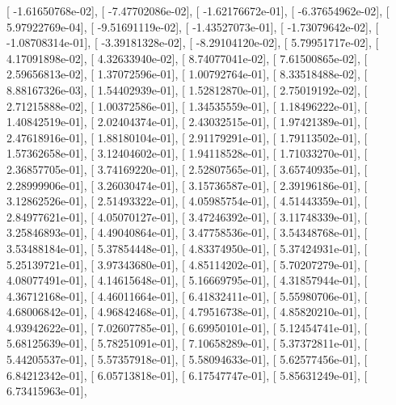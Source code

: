 \documentclass{article}
\begin{document}
       [ -1.61650768e-02],
       [ -7.47702086e-02],
       [ -1.62176672e-01],
       [ -6.37654962e-02],
       [  5.97922769e-04],
       [ -9.51691119e-02],
       [ -1.43527073e-01],
       [ -1.73079642e-02],
       [ -1.08708314e-01],
       [ -3.39181328e-02],
       [ -8.29104120e-02],
       [  5.79951717e-02],
       [  4.17091898e-02],
       [  4.32633940e-02],
       [  8.74077041e-02],
       [  7.61500865e-02],
       [  2.59656813e-02],
       [  1.37072596e-01],
       [  1.00792764e-01],
       [  8.33518488e-02],
       [  8.88167326e-03],
       [  1.54402939e-01],
       [  1.52812870e-01],
       [  2.75019192e-02],
       [  2.71215888e-02],
       [  1.00372586e-01],
       [  1.34535559e-01],
       [  1.18496222e-01],
       [  1.40842519e-01],
       [  2.02404374e-01],
       [  2.43032515e-01],
       [  1.97421389e-01],
       [  2.47618916e-01],
       [  1.88180104e-01],
       [  2.91179291e-01],
       [  1.79113502e-01],
       [  1.57362658e-01],
       [  3.12404602e-01],
       [  1.94118528e-01],
       [  1.71033270e-01],
       [  2.36857705e-01],
       [  3.74169220e-01],
       [  2.52807565e-01],
       [  3.65740935e-01],
       [  2.28999906e-01],
       [  3.26030474e-01],
       [  3.15736587e-01],
       [  2.39196186e-01],
       [  3.12862526e-01],
       [  2.51493322e-01],
       [  4.05985754e-01],
       [  4.51443359e-01],
       [  2.84977621e-01],
       [  4.05070127e-01],
       [  3.47246392e-01],
       [  3.11748339e-01],
       [  3.25846893e-01],
       [  4.49040864e-01],
       [  3.47758536e-01],
       [  3.54348768e-01],
       [  3.53488184e-01],
       [  5.37854448e-01],
       [  4.83374950e-01],
       [  5.37424931e-01],
       [  5.25139721e-01],
       [  3.97343680e-01],
       [  4.85114202e-01],
       [  5.70207279e-01],
       [  4.08077491e-01],
       [  4.14615648e-01],
       [  5.16669795e-01],
       [  4.31857944e-01],
       [  4.36712168e-01],
       [  4.46011664e-01],
       [  6.41832411e-01],
       [  5.55980706e-01],
       [  4.68006842e-01],
       [  4.96842468e-01],
       [  4.79516738e-01],
       [  4.85820210e-01],
       [  4.93942622e-01],
       [  7.02607785e-01],
       [  6.69950101e-01],
       [  5.12454741e-01],
       [  5.68125639e-01],
       [  5.78251091e-01],
       [  7.10658289e-01],
       [  5.37372811e-01],
       [  5.44205537e-01],
       [  5.57357918e-01],
       [  5.58094633e-01],
       [  5.62577456e-01],
       [  6.84212342e-01],
       [  6.05713818e-01],
       [  6.17547747e-01],
       [  5.85631249e-01],
       [  6.73415963e-01],
\end{document}

